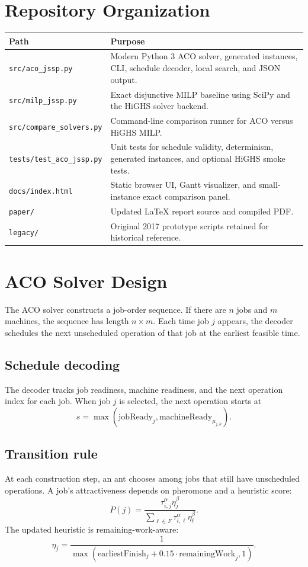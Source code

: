 \documentclass[11pt]{article}
\begin{document}
\section{Repository Organization}
\begin{longtable}{p{2.15in}p{4.1in}}\toprule\textbf{Path} & \textbf{Purpose} \\ \midrule
\texttt{src/aco\_jssp.py} & Modern Python 3 ACO solver, generated instances, CLI, schedule decoder, local search, and JSON output. \\
\texttt{src/milp\_jssp.py} & Exact disjunctive MILP baseline using SciPy and the HiGHS solver backend. \\
\texttt{src/compare\_solvers.py} & Command-line comparison runner for ACO versus HiGHS MILP. \\
\texttt{tests/test\_aco\_jssp.py} & Unit tests for schedule validity, determinism, generated instances, and optional HiGHS smoke tests. \\
\texttt{docs/index.html} & Static browser UI, Gantt visualizer, and small-instance exact comparison panel. \\
\texttt{paper/} & Updated LaTeX report source and compiled PDF. \\
\texttt{legacy/} & Original 2017 prototype scripts retained for historical reference. \\
\bottomrule\end{longtable}
\section{ACO Solver Design}
The ACO solver constructs a job-order sequence. If there are $n$ jobs and $m$ machines, the sequence has length $n\times m$. Each time job $j$ appears, the decoder schedules the next unscheduled operation of that job at the earliest feasible time.
\subsection{Schedule decoding} The decoder tracks job readiness, machine readiness, and the next operation index for each job. When job $j$ is selected, the next operation starts at \[s=\max(\text{jobReady}_j,\text{machineReady}_{\mu_{j,k}}).\]
\subsection{Transition rule} At each construction step, an ant chooses among jobs that still have unscheduled operations. A job's attractiveness depends on pheromone and a heuristic score: \[P(j)=\frac{\tau_{i,j}^{\alpha}\eta_j^{\beta}}{\sum_{\ell\in F}\tau_{i,\ell}^{\alpha}\eta_{\ell}^{\beta}}.\] The updated heuristic is remaining-work-aware: \[\eta_j=\frac{1}{\max(\text{earliestFinish}_j+0.15\cdot\text{remainingWork}_j,1)}.\]
\end{document}
